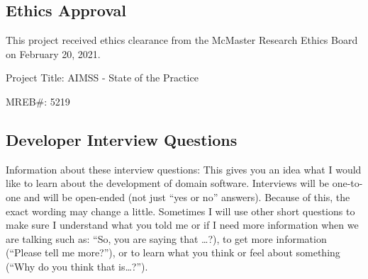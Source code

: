 \documentclass[12pt, notitlepage]{article}
\begin{document}
\begin{singlespace}
\subsection{Ethics Approval}
This project received ethics clearance from the McMaster Research Ethics Board on February 20, 2021.\newline


Project Title: AIMSS - State of the Practice\newline


MREB\#: 5219

\newpage

\subsection{Developer Interview Questions}\label{interviewquestions}

Information about these interview questions:  This gives you an idea what I would like to learn about the development of {domain} software. Interviews will be one-to-one and will be open-ended (not just “yes or no” answers). Because of this, the exact wording may change a little. Sometimes I will use other short questions to make sure I understand what you told me or if I need more information when we are talking such as: “So, you are saying that …?), to get more information (“Please tell me more?”), or to learn what you think or feel about something (“Why do you think that is…?”). 


\end{singlespace}
\end{document}
